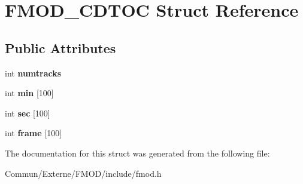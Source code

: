 \hypertarget{struct_f_m_o_d___c_d_t_o_c}{}\section{F\+M\+O\+D\+\_\+\+C\+D\+T\+OC Struct Reference}
\label{struct_f_m_o_d___c_d_t_o_c}
\subsection*{Public Attributes}
\begin{DoxyCompactItemize}
\item 
int {\bfseries numtracks}\hypertarget{struct_f_m_o_d___c_d_t_o_c_aad0a3526919d1d67958c47179a73cf7b}{}\label{struct_f_m_o_d___c_d_t_o_c_aad0a3526919d1d67958c47179a73cf7b}

\item 
int {\bfseries min} \mbox{[}100\mbox{]}\hypertarget{struct_f_m_o_d___c_d_t_o_c_ac32672636e86e7d5da6cd02737123f0e}{}\label{struct_f_m_o_d___c_d_t_o_c_ac32672636e86e7d5da6cd02737123f0e}

\item 
int {\bfseries sec} \mbox{[}100\mbox{]}\hypertarget{struct_f_m_o_d___c_d_t_o_c_a20dcf991841f7f4322904f9a1175e7c6}{}\label{struct_f_m_o_d___c_d_t_o_c_a20dcf991841f7f4322904f9a1175e7c6}

\item 
int {\bfseries frame} \mbox{[}100\mbox{]}\hypertarget{struct_f_m_o_d___c_d_t_o_c_a40e8bdc25c765a02c4ca0af13c74dc5f}{}\label{struct_f_m_o_d___c_d_t_o_c_a40e8bdc25c765a02c4ca0af13c74dc5f}

\end{DoxyCompactItemize}


The documentation for this struct was generated from the following file\+:\begin{DoxyCompactItemize}
\item 
Commun/\+Externe/\+F\+M\+O\+D/include/fmod.\+h\end{DoxyCompactItemize}

